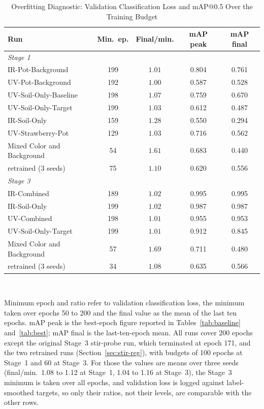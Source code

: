 ﻿\documentclass[journal]{IEEEtran}
\begin{document}
\begin{table}[!t]
\renewcommand{\arraystretch}{1.3}
\caption{Overfitting Diagnostic: Validation Classification Loss and mAP@0.5 Over the Training Budget}
\label{tab:overfit}
\centering
\footnotesize
\setlength{\tabcolsep}{3.5pt}
\begin{tabular}{l c c c c}
\toprule
\textbf{Run} & \textbf{Min.\ ep.} & \textbf{Final/min.} & \textbf{mAP peak} & \textbf{mAP final} \\
\midrule
\multicolumn{5}{l}{\emph{Stage 1}} \\
IR-Pot-Background & 199 & $1.01$ & 0.804 & 0.761 \\
UV-Pot-Background & 192 & $1.00$ & 0.587 & 0.528 \\
UV-Soil-Only-Baseline & 198 & $1.07$ & 0.759 & 0.670 \\
UV-Soil-Only-Target & 199 & $1.03$ & 0.612 & 0.487 \\
IR-Soil-Only & 159 & $1.28$ & 0.550 & 0.294 \\
UV-Strawberry-Pot & 129 & $1.03$ & 0.716 & 0.562 \\
Mixed Color and Background & 54 & $\mathbf{1.61}$ & 0.683 & 0.440 \\
\quad retrained (3 seeds) & 75 & $1.10$ & 0.620 & 0.556 \\
\midrule
\multicolumn{5}{l}{\emph{Stage 3}} \\
IR-Combined & 189 & $1.02$ & 0.995 & 0.995 \\
IR-Soil-Only & 199 & $1.02$ & 0.987 & 0.987 \\
UV-Combined & 198 & $1.01$ & 0.955 & 0.953 \\
UV-Soil-Only-Target & 199 & $1.01$ & 0.912 & 0.845 \\
Mixed Color and Background & 57 & $\mathbf{1.69}$ & 0.711 & 0.480 \\
\quad retrained (3 seeds) & 34 & $1.08$ & 0.635 & 0.566 \\
\bottomrule
\end{tabular}
\\[2pt]
\parbox{\columnwidth}{\footnotesize Minimum epoch and ratio refer to validation classification loss, the minimum taken over epochs 50 to 200 and the final value as the mean of the last ten epochs. mAP peak is the best-epoch figure reported in Tables~\ref{tab:baseline} and~\ref{tab:best}; mAP final is the last-ten-epoch mean. All runs cover 200 epochs except the original Stage~3 stir-probe run, which terminated at epoch 171, and the two retrained runs (Section~\ref{sec:stir-reg}), with budgets of 100 epochs at Stage~1 and 60 at Stage~3. For those the values are means over three seeds (final/min.\ 1.08 to 1.12 at Stage~1, 1.04 to 1.16 at Stage~3), the Stage~3 minimum is taken over all epochs, and validation loss is logged against label-smoothed targets, so only their ratios, not their levels, are comparable with the other rows.}
\end{table}
\end{document}
